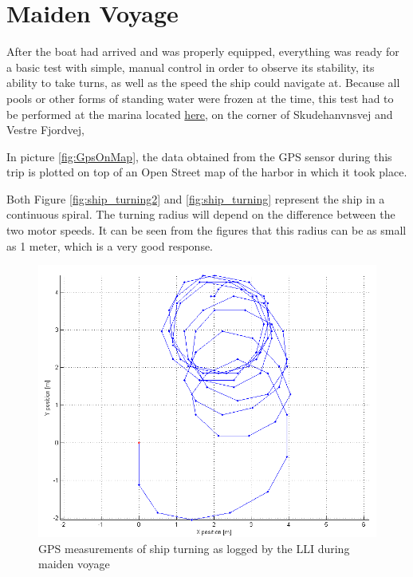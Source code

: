 \chapter{Maiden Voyage}

After the boat had arrived and was properly equipped, everything was ready for a basic test with simple, manual control in order to observe its stability, its ability to take turns, as well as the speed the ship could navigate at. Because all pools or other forms of standing water were frozen at the time, this test had to be performed at the marina located \href{https://maps.google.com/?ll=57.058301,9.896772&spn=0.003495,0.009645&t=h&z=17""}{here}, on the corner of Skudehanvnsvej and Vestre Fjordvej, 

In picture \vref{fig:GpsOnMap}, the data obtained from the GPS sensor during this trip is plotted on top of an Open Street map of the harbor in which it took place. 

Both Figure \vref{fig:ship_turning2} and \vref{fig:ship_turning} represent the ship in a continuous spiral. The turning radius will depend on the difference between the two motor speeds. It can be seen from the figures that this radius can be as small as 1 meter, which is a very good response.

\begin{figure}[htbp]
	\begin{center}
		\includegraphics[width=\textwidth]{img/maidenVoyage/ship_turning2}     
		\caption{GPS measurements of ship turning as logged by the LLI during maiden voyage} 
		\label{fig:ship_turning2}               
	\end{center}   
\end{figure}

